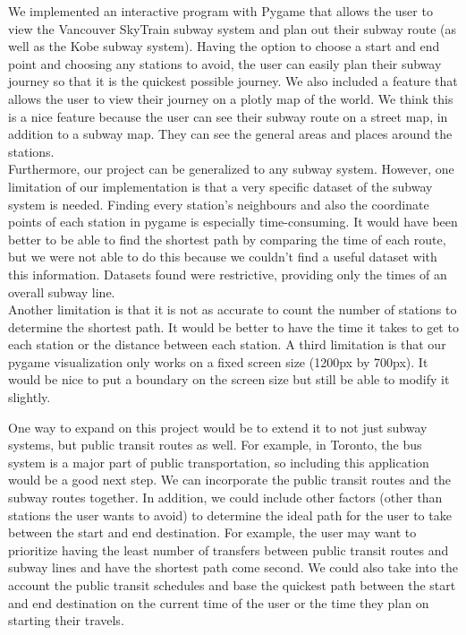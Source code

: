 \documentclass[fontsize=11pt]{article}
\begin{document}
We implemented an interactive program with Pygame that allows the user to view the Vancouver SkyTrain subway system and plan out their subway route (as well as the Kobe subway system). Having the option to choose a start and end point and choosing any stations to avoid, the user can easily plan their subway journey so that it is the quickest possible journey. We also included a feature that allows the user to view their journey on a plotly map of the world. We think this is a nice feature because the user can see their subway route on a street map, in addition to a subway map. They can see the general areas and places around the stations. \\

Furthermore, our project can be generalized to any subway system. However, one limitation of our implementation is that a very specific dataset of the subway system is needed. Finding every station’s neighbours and also the coordinate points of each station in pygame is especially time-consuming. It would have been better to be able to find the shortest path by comparing the time of each route, but we were not able to do this because we couldn’t find a useful dataset with this information. Datasets found were restrictive, providing only the times of an overall subway line. \\

Another limitation is that it is not as accurate to count the number of stations to determine the shortest path. It would be better to have the time it takes to get to each station or the distance between each station. A third limitation is that our pygame visualization only works on a fixed screen size (1200px by 700px). It would be nice to put a boundary on the screen size but still be able to modify it slightly. \\

\newpage

One way to expand on this project would be to extend it to not just subway systems, but public transit routes as well. For example, in Toronto, the bus system is a major part of public transportation, so including this application would be a good next step. We can incorporate the public transit routes and the subway routes together. In addition, we could include other factors (other than stations the user wants to avoid) to determine the ideal path for the user to take between the start and end destination. For example, the user may want to prioritize having the least number of transfers between public transit routes and subway lines and have the shortest path come second. We could also take into the account the public transit schedules and base the quickest path between the start and end destination on the current time of the user or the time they plan on starting their travels. \\
\end{document}
